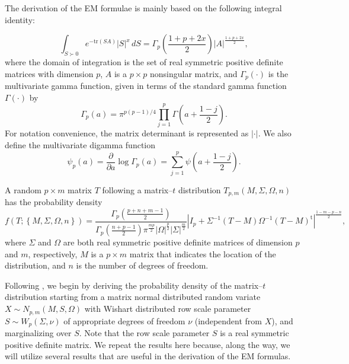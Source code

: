 \documentclass[english,listof=totoc]{scrartcl}
\begin{document}
The derivation of the EM formulae is mainly based on the following
integral identity:

\begin{equation}
\int_{S\succ 0}e^{-\textrm{tr}(SA)}|S|^{x}\,dS=\Gamma_{p}\left(\frac{1+p+2x}{2}\right)|A|^{\frac{1+p+2x}{2}},\label{eq:intmultgammadef}
\end{equation}
where the domain of integration is the set of real symmetric
positive definite matrices with dimension $p$, $A$ is a $p\times p$
nonsingular matrix, and $\Gamma_{p}(\cdot)$ is the multivariate gamma
function, given in terms of the standard gamma function $\Gamma(\cdot)$
by
\begin{equation}
\Gamma_{p}(a)=\pi^{p(p-1)/4}\prod_{j=1}^{p}\Gamma\left(a+\frac{1-j}{2}\right).\label{eq:multgammadef}
\end{equation}
For notation convenience, the matrix determinant is represented as
$|\cdot|$. We also define the multivariate digamma function
%
\begin{equation} \psi_{p}(a)=\frac{\partial}{\partial
	a}\log\Gamma_{p}(a)=\sum_{j=1}^{p}\psi\left(a+\frac{1-j}{2}\right).
\end{equation}

A random $p\times m$ matrix $T$ following a matrix--$t$ distribution
$T_{p,m}(M,\Sigma,\Omega,n)$ has the probability density
\begin{equation}
f(T;\left\{M,\Sigma,\Omega,n\right\})=\frac{\Gamma_{p}\left(\frac{p+n+m-1}{2}\right)}{\Gamma_{p}\left(\frac{n+p-1}{2}\right)\pi^{\frac{mp}{2}}|\Omega|^{\frac{p}{2}}|\Sigma|^{\frac{m}{2}}}
|I_p+\Sigma^{-1}(T-M)\Omega^{-1}(T-M)^{\textrm{t}}|^{\frac{1-m-p-n}{2}},
\label{eq:matrixtpdf}
\end{equation}
where $\Sigma$ and $\Omega$ are both real symmetric positive definite
matrices of dimension $p$ and $m$, respectively, $M$ is a $p\times m$
matrix that indicates the location of the distribution, and $n$ is the
number of degrees of freedom.

Following \citet{gupta1999matrix}, we begin by deriving the
probability density of the matrix--$t$ distribution starting from
a matrix normal distributed random variate $X\sim N_{p,m}(M,S,\Omega)$
with Wishart distributed row scale parameter $S \sim W_{p}\left(\Sigma,\nu\right)$ of appropriate degrees of freedom $\nu$ (independent from $X$), and marginalizing over $S$. Note that the row scale
parameter $S$ is a real symmetric positive definite matrix. We repeat the results here because, along the way, we will utilize several results that are useful in the derivation of the EM formulas.
\end{document}

